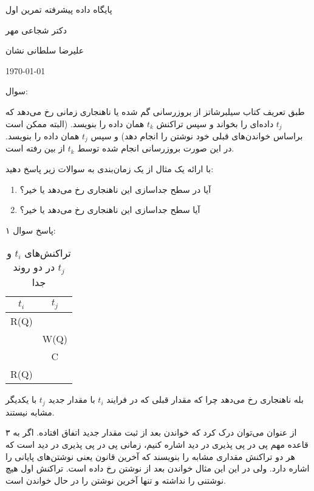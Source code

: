 \documentclass[a4paper]{article}
\begin{document}
\centerline{پایگاه داده پیشرفته تمرین اول}
\centerline{دکتر شجاعی مهر}
\centerline{علیرضا سلطانی نشان}
\centerline{\today}

سوال: 

طبق تعریف کتاب سیلبرشاتز از بروزرسانی گم شده یا  ناهنجاری زمانی
رخ می‌دهد که $t_{j}$ داده‌ای را بخواند و سپس تراکنش $t_{k}$ همان داده را بنویسد.
(البته ممکن است براساس خواندن‌های قبلی خود نوشتن را انجام دهد) و سپس $t_{j}$
همان داده‌ را بنویسد. در این صورت بروزرسانی انجام شده توسط $t_{k}$ از بین رفته
است.

با ارائه یک مثال از یک زمان‌بندی به سوالات زیر پاسخ دهید:

\begin{enumerate}
    \item آیا در سطح جداسازی  این ناهنجاری رخ می‌دهد یا خیر؟
    \item آیا سطح جداسازی  این ناهنجاری رخ می‌دهد یا خیر؟
\end{enumerate}

پاسخ سوال ۱:


\begin{LTR}
    \begin{table}[h]
        \centering
        \begin{RTL}
            \caption{تراکنش‌های $t_{i}$ و $t_{j}$ در دو روند جدا}
        \end{RTL}
        \begin{tabular}{|c|c|}
            \hline
            $t_{i}$ & $t_{j}$ \\ \hline
            R(Q) & \\ \hline
             & W(Q) \\ \hline
             & C \\ \hline
            R(Q) &  \\ \hline
        \end{tabular}
    \end{table}
\end{LTR}

بله ناهنجاری رخ می‌دهد چرا که مقدار قبلی که در فرایند $t_{i}$ با مقدار جدید
$t_{j}$ با یکدیگر مشابه نیستند.

از عنوان می‌توان درک کرد که خواندن بعد از ثبت مقدار جدید اتفاق افتاده. اگر به ۳
قاعده مهم پی در پی پذیری در دید اشاره کنیم، زمانی پی در پی پذیری در دید است که
هر دو تراکنش مقداری مشابه را بنویسند که آخرین قانون یعنی نوشتن‌های پایانی را
اشاره دارد. ولی در این این مثال خواندن بعد از نوشتن رخ داده است. تراکنش اول هیچ
نوشتنی را نداشته و تنها آخرین نوشتن را در حال خواندن است.
\end{document}
